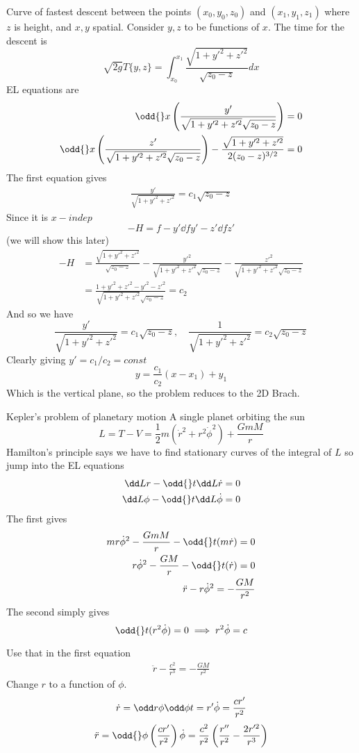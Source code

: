 \documentclass{E:/Documents/Latex/myassignment}
\begin{document}
Curve of fastest descent between the points $(x_0,y_0,z_0)$ and $(x_1,y_1,z_1)$ where $z$ is height, and $x,y$ spatial. Consider $y,z$ to be functions of $x$. The time for the descent is
\[\sqrt{2g} T\{y,z\} = \int_{x_0}^{x_1} \frac{\sqrt{1 + y'^2 + z'^2}}{\sqrt{z_0 - z}} dx\] 
EL equations are
\begin{align*}
	\odd{}x \left(\frac{y'}{\sqrt{1 + y'^2 + z'^2} \sqrt{z_0 - z}}\right) = 0\\
\odd{}x \left(\frac{z'}{\sqrt{1 + y'^2 + z'^2} \sqrt{z_0 - z}}\right) - \frac{\sqrt{1 + y'^2 + z'^2}}{2(z_0 - z)^{3/2}} = 0
\end{align*}
The first equation gives
\begin{align*}
	\frac{y'}{\sqrt{1 + y'^2 + z'^2}} = c_1\sqrt{z_0-z}
\end{align*}
Since it is $x-indep$
\[-H = f - y'\dd f{y'} - z' \dd f{z'}\]
(we will show this later)
\begin{align*}
	-H &= \frac{\sqrt{1+y'^2+z'^2}}{\sqrt{z_0 -z}} -\frac{y'^2}{\sqrt{1 + y'^2 + z'^2} \sqrt{z_0 - z}} -\frac{z'^2}{\sqrt{1 + y'^2 + z'^2} \sqrt{z_0 - z}}\\
	&=\frac{1 + y'^2 + z'^2 - y'^2 - z'^2}{\sqrt{1 + y'^2 + z'^2} \sqrt{z_0 - z}} = c_2
\end{align*}
And so we have
\[\frac{y'}{\sqrt{1 + y'^2 + z'^2}} = c_1\sqrt{z_0-z}, \quad \frac{1}{\sqrt{1 + y'^2 + z'^2}} = c_2 \sqrt{z_0 - z}\]
Clearly giving $y' = c_1/c_2 = const$
\[y = \frac{c_1}{c_2}(x-x_1) + y_1\]
Which is the vertical plane, so the problem reduces to the 2D Brach.


Kepler's problem of planetary motion
A single planet orbiting the sun
\[L = T-V = \frac12 m(\dot r^2 + r^2 \dot\phi ^2) + \frac{GmM}{r}\]
Hamilton's principle says we have to find stationary curves of the integral of $L$ so jump into the EL equations
\begin{align*}
	\dd Lr - \odd{}t \dd L{\dot r} = 0\\
	\dd L\phi - \odd {}t \dd L{\dot\phi} = 0
\end{align*}
The first gives
\begin{align*}
	mr\dot\phi^2 - \frac{GmM}{r} - \odd{}t (m\dot r) = 0\\
	r\dot\phi^2 - \frac{GM}{r} - \odd{}t (\dot r) = 0\\
	\ddot r - r \dot\phi^2 = -\frac{GM}{r^2}
\end{align*}
The second simply gives
\[\odd{}t (r^2\dot\phi) = 0 \implies r^2\dot\phi = c\]

Use that in the first equation
\begin{align*}
	\ddot r - \frac{c^2}{r^3} = - \frac{GM}{r^2}
\end{align*}
Change $r$ to a function of $\phi$.
\[\dot r = \odd r\phi \odd\phi t = r'\dot \phi = \frac{cr'}{r^2}\]
\[\ddot r = \odd{}\phi \left(\frac{cr'}{r^2}\right)\dot\phi = \frac{c^2}{r^2} \left(\frac{r''}{r^2} - \frac{2r'^2}{r^3}\right)\]
\end{document}
